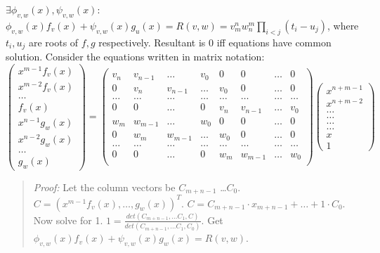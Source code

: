 $\exists \phi_{v,w}(x), \psi_{v,w} (x):$
$\phi_{v,w}(x) f_{v}(x) + \psi_{v,w}(x) g_{u}(x) = R(v,w)
= v_{m}^n w_{n}^m \prod_{i<j} (t_{i}-u_{j})$, where $t_i , u_j$ are roots of
$f, g$ respectively.  Resultant is 0 iff equations have common solution.  
Consider the equations written in matrix notation:
$$
\left(
\begin{array}{c}
x^{m-1}f_{v} (x) \\
x^{m-2}f_{v} (x) \\
\ldots \\
f_{v} (x) \\
x^{n-1}g_{w} (x) \\
x^{n-2}g_{w} (x) \\
\ldots \\
g_{w} (x)
\end{array}
\right) =
\left(
\begin{array}{cccccccc}
v_n & v_{n-1} & \ldots & v_0 & 0 & 0 & \ldots & 0 \\
0 & v_n & v_{n-1} & \ldots & v_0 & 0 & \ldots & 0 \\
\ldots & \ldots & \ldots & \ldots & \ldots & \ldots & \ldots & \ldots\\
0 & 0 & \ldots & 0 & v_n & v_{n-1} & \ldots & v_0 \\
w_m & w_{m-1} & \ldots & w_0 & 0 & 0 & \ldots & 0 \\
0 & w_m & w_{m-1} & \ldots & w_0 & 0 & \ldots & 0 \\
\ldots & \ldots & \ldots & \ldots & \ldots & \ldots & \ldots & \ldots\\
0 & 0 & \ldots & 0 & w_m & w_{m-1} & \ldots & w_0 \\
\end{array}
\right)
\left(
\begin{array}{c}
x^{n+m-1}\\
x^{n+m-2}\\
\ldots \\
\ldots \\
\ldots \\
\ldots \\
x \\
1
\end{array}
\right)
$$
\begin{quote}
\emph{Proof:} Let the column vectors be $C_{m+n-1}$ \ldots $C_{0}$.
$C= (x^{m-1}f_v(x), \ldots , g_w (x))^T$.
$C= C_{m+n-1} \cdot x_{m+n-1} + \ldots + 1 \cdot C_{0}$.
Now solve for 1.  $1= {\frac {det(C_{m+n-1}, \ldots C_{1}, C)}
{det(C_{m+n-1}, \ldots C_{1}, C_{0})}}$.
Get $\phi_{v,w}(x)f_{v}(x) +
\psi_{v,w}(x)g_{w}(x)= R(v,w)$.
\end{quote}
